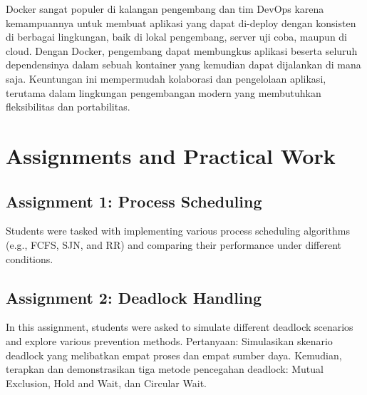 \documentclass[12pt]{article}
\begin{document}
\begin{enumerate}
    Docker sangat populer di kalangan pengembang dan tim DevOps karena kemampuannya untuk membuat aplikasi yang dapat di-deploy dengan konsisten di berbagai lingkungan, baik di lokal pengembang, server uji coba, maupun di cloud. Dengan Docker, pengembang dapat membungkus aplikasi beserta seluruh dependensinya dalam sebuah kontainer yang kemudian dapat dijalankan di mana saja. Keuntungan ini mempermudah kolaborasi dan pengelolaan aplikasi, terutama dalam lingkungan pengembangan modern yang membutuhkan fleksibilitas dan portabilitas.
\end{enumerate}

\section{Assignments and Practical Work}
\subsection{Assignment 1: Process Scheduling}
Students were tasked with implementing various process scheduling algorithms (e.g., FCFS, SJN, and RR) and comparing their performance under different conditions.

\subsection{Assignment 2: Deadlock Handling}
In this assignment, students were asked to simulate different deadlock scenarios and explore various prevention methods.
Pertanyaan:
Simulasikan skenario deadlock yang melibatkan empat proses dan empat sumber daya. Kemudian, terapkan dan demonstrasikan tiga metode pencegahan deadlock: Mutual Exclusion, Hold and Wait, dan Circular Wait.
\end{document}
